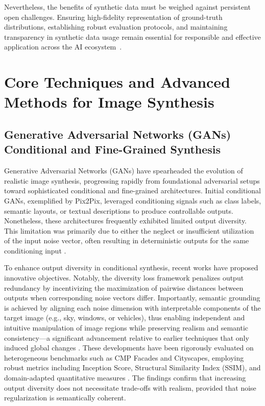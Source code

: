 Nevertheless, the benefits of synthetic data must be weighed against persistent open challenges. Ensuring high-fidelity representation of ground-truth distributions, establishing robust evaluation protocols, and maintaining transparency in synthetic data usage remain essential for responsible and effective application across the AI ecosystem~\cite{ref13,ref62,ref63,ref87,ref88}.

\section{Core Techniques and Advanced Methods for Image Synthesis}

\subsection{Generative Adversarial Networks (GANs) Conditional and Fine-Grained Synthesis}

Generative Adversarial Networks (GANs) have spearheaded the evolution of realistic image synthesis, progressing rapidly from foundational adversarial setups toward sophisticated conditional and fine-grained architectures. Initial conditional GANs, exemplified by Pix2Pix, leveraged conditioning signals such as class labels, semantic layouts, or textual descriptions to produce controllable outputs. Nonetheless, these architectures frequently exhibited limited output diversity. This limitation was primarily due to either the neglect or insufficient utilization of the input noise vector, often resulting in deterministic outputs for the same conditioning input \cite{ref93,ref95}.

To enhance output diversity in conditional synthesis, recent works have proposed innovative objectives. Notably, the diversity loss framework penalizes output redundancy by incentivizing the maximization of pairwise distances between outputs when corresponding noise vectors differ. Importantly, semantic grounding is achieved by aligning each noise dimension with interpretable components of the target image (e.g., sky, windows, or vehicles), thus enabling independent and intuitive manipulation of image regions while preserving realism and semantic consistency---a significant advancement relative to earlier techniques that only induced global changes \cite{ref93}. These developments have been rigorously evaluated on heterogeneous benchmarks such as CMP Facades and Cityscapes, employing robust metrics including Inception Score, Structural Similarity Index (SSIM), and domain-adapted quantitative measures \cite{ref93,ref95}. The findings confirm that increasing output diversity does not necessitate trade-offs with realism, provided that noise regularization is semantically coherent.


